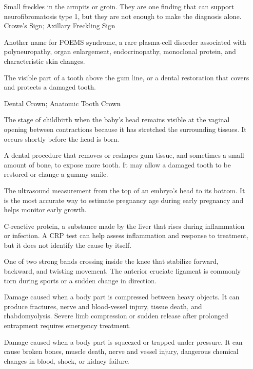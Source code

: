  Small freckles in the armpits or groin. They are one finding that can support neurofibromatosis type 1, but they are not enough to make the diagnosis alone.
\synonyms
Crowe's Sign; Axillary Freckling Sign

 Another name for POEMS syndrome, a rare plasma-cell disorder associated with polyneuropathy, organ enlargement, endocrinopathy, monoclonal protein, and characteristic skin changes.

 The visible part of a tooth above the gum line, or a dental restoration that covers and protects a damaged tooth.

\synonyms
Dental Crown; Anatomic Tooth Crown

 The stage of childbirth when the baby's head remains visible at the vaginal opening between contractions because it has stretched the surrounding tissues. It occurs shortly before the head is born.

 A dental procedure that removes or reshapes gum tissue, and sometimes a small amount of bone, to expose more tooth. It may allow a damaged tooth to be restored or change a gummy smile.

 The ultrasound measurement from the top of an embryo's head to its bottom. It is the most accurate way to estimate pregnancy age during early pregnancy and helps monitor early growth.

 C-reactive protein, a substance made by the liver that rises during inflammation or infection. A CRP test can help assess inflammation and response to treatment, but it does not identify the cause by itself.

 One of two strong bands crossing inside the knee that stabilize forward, backward, and twisting movement. The anterior cruciate ligament is commonly torn during sports or a sudden change in direction.

 Damage caused when a body part is compressed between heavy objects. It can produce fractures,
nerve and blood-vessel injury, tissue death, and rhabdomyolysis. Severe limb compression
or sudden release after prolonged entrapment requires emergency treatment.

 Damage caused when a body part is squeezed or trapped under pressure. It can cause broken bones, muscle death, nerve and vessel injury, dangerous chemical changes in blood, shock, or kidney failure.

